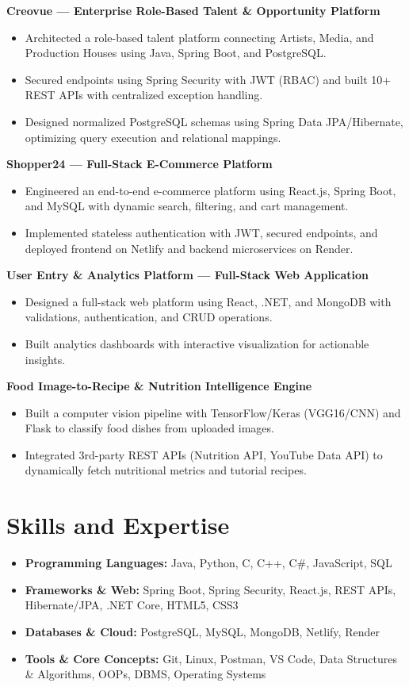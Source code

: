\documentclass[10pt]{article}
\newcommand{\resumeItem}[1]{\item{\small #1}}
\newcommand{\resumeEntryNoRight}[2]{
  \noindent\textbf{#1} \hfill {\small #2}\\[0.05em]
}
\begin{document}
\resumeEntryNoRight{Creovue --- Enterprise Role-Based Talent \& Opportunity Platform}{}
\begin{itemize}
  \resumeItem{Architected a role-based talent platform connecting Artists, Media, and Production Houses using Java, Spring Boot, and PostgreSQL.}
  \resumeItem{Secured endpoints using Spring Security with JWT (RBAC) and built 10+ REST APIs with centralized exception handling.}
  \resumeItem{Designed normalized PostgreSQL schemas using Spring Data JPA/Hibernate, optimizing query execution and relational mappings.}
\end{itemize}

\resumeEntryNoRight{Shopper24 --- Full-Stack E-Commerce Platform}{}
\begin{itemize}
  \resumeItem{Engineered an end-to-end e-commerce platform using React.js, Spring Boot, and MySQL with dynamic search, filtering, and cart management.}
  \resumeItem{Implemented stateless authentication with JWT, secured endpoints, and deployed frontend on Netlify and backend microservices on Render.}
\end{itemize}

\resumeEntryNoRight{User Entry \& Analytics Platform --- Full-Stack Web Application}{}
\begin{itemize}
  \resumeItem{Designed a full-stack web platform using React, .NET, and MongoDB with validations, authentication, and CRUD operations.}
  \resumeItem{Built analytics dashboards with interactive visualization for actionable insights.}
\end{itemize}

\resumeEntryNoRight{Food Image-to-Recipe \& Nutrition Intelligence Engine}{}
\begin{itemize}
  \resumeItem{Built a computer vision pipeline with TensorFlow/Keras (VGG16/CNN) and Flask to classify food dishes from uploaded images.}
  \resumeItem{Integrated 3rd-party REST APIs (Nutrition API, YouTube Data API) to dynamically fetch nutritional metrics and tutorial recipes.}
\end{itemize}

\section*{Skills and Expertise}
\begin{itemize}
  \resumeItem{\textbf{Programming Languages:} Java, Python, C, C++, C\#, JavaScript, SQL}
  \resumeItem{\textbf{Frameworks \& Web:} Spring Boot, Spring Security, React.js, REST APIs, Hibernate/JPA, .NET Core, HTML5, CSS3}
  \resumeItem{\textbf{Databases \& Cloud:} PostgreSQL, MySQL, MongoDB, Netlify, Render}
  \resumeItem{\textbf{Tools \& Core Concepts:} Git, Linux, Postman, VS Code, Data Structures \& Algorithms, OOPs, DBMS, Operating Systems}
\end{itemize}
\end{document}
